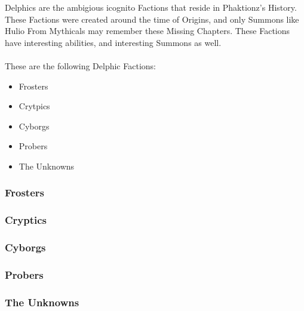 Delphics are the ambigious icognito Factions that reside in Phaktionz's History. These Factions 
were created around the time of Origins, and only Summons like Hulio From Mythicals may remember 
these Missing Chapters. These Factions have interesting abilities, and interesting Summons as well. 
\\\\
These are the following Delphic Factions: 
\begin{itemize}
    \item Frosters
    \item Crytpics 
    \item Cyborgs 
    \item Probers
    \item The Unknowns 
\end{itemize}

\subsubsection{Frosters}

\subsubsection{Cryptics}

\subsubsection{Cyborgs}

\subsubsection{Probers}

\subsubsection{The Unknowns}